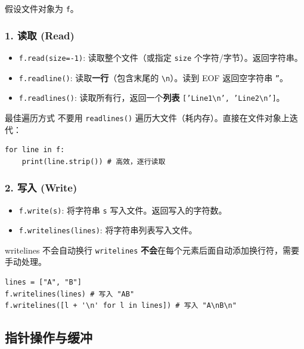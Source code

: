 \documentclass[12pt, a4paper]{article}
\begin{document}
假设文件对象为 \texttt{f}。

\subsubsection{1. 读取 (Read)}
\begin{itemize}
    \item \texttt{f.read(size=-1)}: 读取整个文件（或指定 \texttt{size} 个字符/字节）。返回字符串。
    \item \texttt{f.readline()}: 读取\textbf{一行}（包含末尾的 \texttt{\textbackslash n}）。读到 EOF 返回空字符串 \texttt{''}。
    \item \texttt{f.readlines()}: 读取所有行，返回一个\textbf{列表} \texttt{['Line1\textbackslash n', 'Line2\textbackslash n']}。
\end{itemize}

\begin{importantbox}{最佳遍历方式}
不要用 \texttt{readlines()} 遍历大文件（耗内存）。直接在文件对象上迭代：
\begin{lstlisting}
for line in f:
    print(line.strip()) # 高效，逐行读取
\end{lstlisting}
\end{importantbox}

\subsubsection{2. 写入 (Write)}
\begin{itemize}
    \item \texttt{f.write(s)}: 将字符串 \texttt{s} 写入文件。返回写入的字符数。
    \item \texttt{f.writelines(lines)}: 将字符串列表写入文件。
\end{itemize}

\begin{trapbox}{writelines 不会自动换行}
\texttt{writelines} \textbf{不会}在每个元素后面自动添加换行符，需要手动处理。
\begin{lstlisting}
lines = ["A", "B"]
f.writelines(lines) # 写入 "AB"
f.writelines([l + '\n' for l in lines]) # 写入 "A\nB\n"
\end{lstlisting}
\end{trapbox}

\subsection{指针操作与缓冲}
\end{document}
